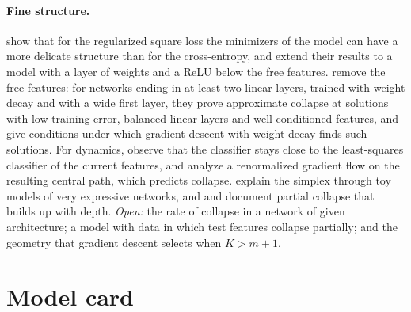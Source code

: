 \begin{refsection}
\paragraph{Fine structure.} \Textcite{TirerBruna2022} show that for the regularized square loss the minimizers of the model can have a more delicate structure than for the cross-entropy, and extend their results to a model with a layer of weights and a ReLU below the free features. \Textcite{JacotEtAl2025} remove the free features: for networks ending in at least two linear layers, trained with weight decay and with a wide first layer, they prove approximate collapse at solutions with low training error, balanced linear layers and well-conditioned features, and give conditions under which gradient descent with weight decay finds such solutions. For dynamics, \textcite{HanPapyanDonoho2022} observe that the classifier stays close to the least-squares classifier of the current features, and analyze a renormalized gradient flow on the resulting central path, which predicts collapse. \Textcite{EWojtowytsch2022} explain the simplex through toy models of very expressive networks, and \textcite{HeSu2023} and \textcite{RangamaniEtAl2023} document partial collapse that builds up with depth. \emph{Open:} the rate of collapse in a network of given architecture; a model with data in which test features collapse partially; and the geometry that gradient descent selects when $K>m+1$.

\section{Model card}\label{sec:collapse:card}



\end{refsection}
